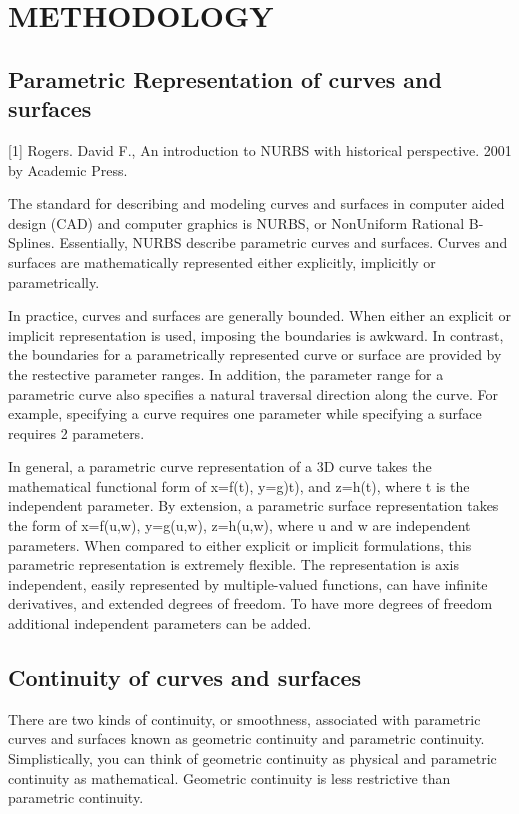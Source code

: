 \chapter{METHODOLOGY}
\label{ch:tocloft}

\section{Parametric Representation of curves and surfaces}


[1] Rogers. David F., An introduction to NURBS with historical perspective. 2001 by Academic Press.


The standard for describing and modeling curves and surfaces in computer aided design (CAD) and computer graphics is NURBS, or NonUniform Rational B-Splines. Essentially, NURBS describe parametric curves and surfaces. Curves and surfaces are mathematically represented either explicitly, implicitly or parametrically.

In practice, curves and surfaces are generally bounded. When either an explicit or implicit representation is used, imposing the boundaries is awkward. In contrast, the boundaries for a parametrically represented curve or surface are provided by the restective parameter ranges. In addition, the parameter range for a parametric curve also specifies a natural traversal direction along the curve. For example, specifying a curve requires one parameter while specifying a surface requires 2 parameters.

In general, a parametric curve representation of a 3D curve takes the mathematical functional form of x=f(t), y=g)t), and z=h(t), where t is the independent parameter. By extension, a parametric surface representation takes the form of x=f(u,w), y=g(u,w), z=h(u,w), where u and w are independent parameters. When compared to either explicit or implicit formulations, this parametric representation is extremely flexible. The representation is axis independent, easily represented by multiple-valued functions, can have infinite derivatives, and extended degrees of freedom.  To have more degrees of freedom additional independent parameters can be added.

\section{Continuity of curves and surfaces}

There are two kinds of continuity, or smoothness, associated with parametric curves and surfaces known as geometric continuity and parametric continuity. Simplistically, you can think of geometric continuity as physical and parametric continuity as mathematical. Geometric continuity is less restrictive than parametric continuity.




